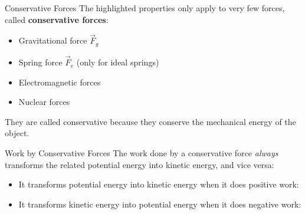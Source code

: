\documentclass[12pt,compress,aspectratio=169]{beamer}
\begin{document}
\begin{frame}{Conservative Forces}
  The highlighted properties only apply to very few forces, called
  \textbf{conservative forces}:
  \begin{itemize}
  \item Gravitational force $\vec F_g$
  \item Spring force $\vec F_e$ (only for ideal springs)
  \item Electromagnetic forces
  \item Nuclear forces
  \end{itemize}
  They are called conservative because they conserve the mechanical energy
  of the object.

\end{frame}



\begin{frame}{Work by Conservative Forces}
  The work done by a conservative force \emph{always} transforms the related
  potential energy into kinetic energy, and vice versa:
  \begin{itemize}
  \item It transforms potential energy into kinetic energy when it
    does {\color{blue}positive} work:

    \vspace{-.4in}{\huge
      \begin{displaymath}
        U\longrightarrow K
      \end{displaymath}
    }

  \item It transforms kinetic energy into potential energy when it
    does {\color{magenta}negative} work:

    \vspace{-.4in}{\huge
      \begin{displaymath}
        U\longleftarrow K
    \end{displaymath}
    }
  \end{itemize}  
\end{frame}
\end{document}
